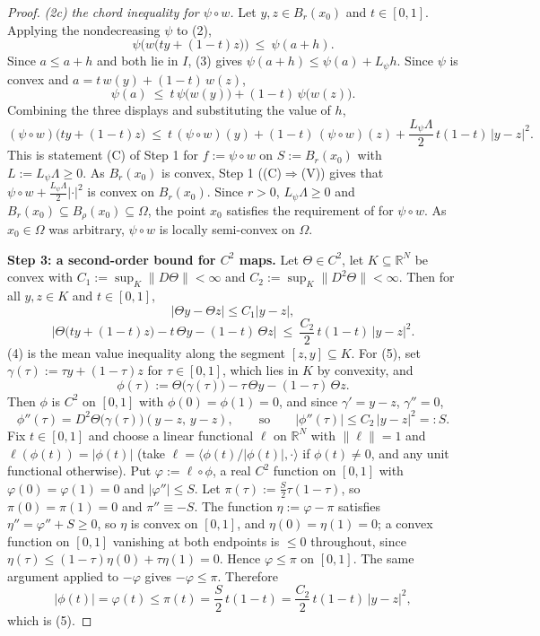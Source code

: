 \begin{proof}
\emph{(2c) the chord inequality for $\psi\circ w$.} Let $y,z\in B_r(x_0)$ and $t\in[0,1]$.
Applying the nondecreasing $\psi$ to (2),
\[
 \psi\Big(w\big(ty+(1-t)z\big)\Big)\ \le\ \psi(a+h).
\]
Since $a\le a+h$ and both lie in $I$, (3) gives $\psi(a+h)\le\psi(a)+L_\psi h$. Since $\psi$
is convex and $a=t\,w(y)+(1-t)\,w(z)$,
\[
 \psi(a)\ \le\ t\,\psi\big(w(y)\big)+(1-t)\,\psi\big(w(z)\big).
\]
Combining the three displays and substituting the value of $h$,
\[
 (\psi\circ w)\big(ty+(1-t)z\big)
  \ \le\ t\,(\psi\circ w)(y)+(1-t)\,(\psi\circ w)(z)
   +\frac{L_\psi\Lambda}{2}\,t(1-t)\,|y-z|^{2}.
\]
This is statement (C) of Step 1 for $f:=\psi\circ w$ on $S:=B_r(x_0)$ with
$L:=L_\psi\Lambda\ge0$. As $B_r(x_0)$ is convex, Step 1 ((C)$\Rightarrow$(V)) gives that
$\psi\circ w+\tfrac{L_\psi\Lambda}{2}|\cdot|^{2}$ is convex on $B_r(x_0)$. Since
$r>0$, $L_\psi\Lambda\ge0$ and $B_r(x_0)\subseteq B_\rho(x_0)\subseteq\Omega$, the point
$x_0$ satisfies the requirement of  for $\psi\circ w$. As
$x_0\in\Omega$ was arbitrary, $\psi\circ w$ is locally semi-convex on $\Omega$.

\medskip\noindent\textbf{Step 3: a second-order bound for $C^{2}$ maps.} Let
$\Theta\in C^{2}$, let $K\subseteq\mathbb R^{N}$ be convex with
$C_1:=\sup_K\|D\Theta\|<\infty$ and $C_2:=\sup_K\|D^{2}\Theta\|<\infty$. Then for all
$y,z\in K$ and $t\in[0,1]$,
\[
 \big|\Theta y-\Theta z\big|\le C_1|y-z|, \tag{4}
\]
\[
 \Big|\Theta\big(ty+(1-t)z\big)-t\,\Theta y-(1-t)\,\Theta z\Big|
  \ \le\ \frac{C_2}{2}\,t(1-t)\,|y-z|^{2}. \tag{5}
\]
(4) is the mean value inequality along the segment $[z,y]\subseteq K$. For (5), set
$\gamma(\tau):=\tau y+(1-\tau)z$ for $\tau\in[0,1]$, which lies in $K$ by convexity, and
\[
 \phi(\tau):=\Theta\big(\gamma(\tau)\big)-\tau\,\Theta y-(1-\tau)\,\Theta z .
\]
Then $\phi$ is $C^{2}$ on $[0,1]$ with $\phi(0)=\phi(1)=0$, and since
$\gamma'=y-z$, $\gamma''=0$,
\[
 \phi''(\tau)=D^{2}\Theta\big(\gamma(\tau)\big)(y-z,\,y-z),
 \qquad\text{so}\qquad |\phi''(\tau)|\le C_2\,|y-z|^{2}=:S .
\]
Fix $t\in[0,1]$ and choose a linear functional $\ell$ on $\mathbb R^{N}$ with $\|\ell\|=1$
and $\ell(\phi(t))=|\phi(t)|$ (take $\ell=\langle\phi(t)/|\phi(t)|,\cdot\rangle$ if
$\phi(t)\ne0$, and any unit functional otherwise). Put $\varphi:=\ell\circ\phi$, a real
$C^{2}$ function on $[0,1]$ with $\varphi(0)=\varphi(1)=0$ and $|\varphi''|\le S$. Let
$\pi(\tau):=\tfrac S2\tau(1-\tau)$, so $\pi(0)=\pi(1)=0$ and $\pi''\equiv-S$. The function
$\eta:=\varphi-\pi$ satisfies $\eta''=\varphi''+S\ge0$, so $\eta$ is convex on $[0,1]$, and
$\eta(0)=\eta(1)=0$; a convex function on $[0,1]$ vanishing at both endpoints is $\le0$
throughout, since $\eta(\tau)\le(1-\tau)\eta(0)+\tau\eta(1)=0$. Hence
$\varphi\le\pi$ on $[0,1]$. The same argument applied to $-\varphi$ gives
$-\varphi\le\pi$. Therefore
\[
 |\phi(t)|=\varphi(t)\le\pi(t)=\frac S2\,t(1-t)=\frac{C_2}{2}\,t(1-t)\,|y-z|^{2},
\]
which is (5).


\end{proof}
